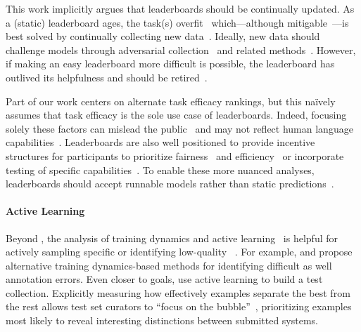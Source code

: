 This work implicitly argues that leaderboards should be
continually updated.  As a (static) leaderboard ages, the task(s)
overfit~\citep{recht2019generalize} which---although
mitigable~\citep{blum2015ladder,andersonCook2019host}---is best solved
by continually collecting new data~\citep{kiela2021dynabench}.
Ideally, new data should challenge models through adversarial
collection~\citep{wallace2018trick,nie2019adversarial} and related
methods~\citep{Gardner2020-gn}.  However, if making an easy
leaderboard more difficult is possible, the
leaderboard has outlived its helpfulness and should be retired~\citep{voorhees1999trec8}.

Part of our work centers on alternate task efficacy rankings, but this
na\"ively assumes that task efficacy is the sole use case of
leaderboards.
Indeed, focusing solely these factors can mislead the
public~\citep{paullada2020data} and may not reflect human language
capabilities~\citep{schlangen2020targeting}.
Leaderboards are also well positioned to provide incentive structures
for participants to prioritize fairness~\citep{bender2018data} and
efficiency~\citep{strubell2019energy,schwartz2020green,min2021efficientqa}
or incorporate testing of specific
capabilities~\citep{ribeiro2020checklist,Dunietz2020-ty}.
To enable these more nuanced analyses, leaderboards should accept
runnable models rather than static
predictions~\citep{ma2021dynaboard}.

\paragraph{\textbf{Active Learning}}
Beyond \irt{}, the analysis of training dynamics and active learning~\citep{settles09active} is helpful for actively sampling specific \itms{} or identifying low-quality \itms{}~\citep{brodley1999mislabel}.
For example, \citet{swayamdipta2020cartography} and \citet{pleiss2020aum} propose alternative training dynamics-based methods for identifying difficult \itms{} as well annotation errors.
Even closer to goals, \citet{rahman2020active} use active learning to build a test collection.
Explicitly measuring how effectively examples separate the best \subj{} from the rest allows test set curators to ``focus on the bubble''~\citep{boydgraber2020nerds}, prioritizing examples most likely to reveal interesting distinctions between submitted systems.

